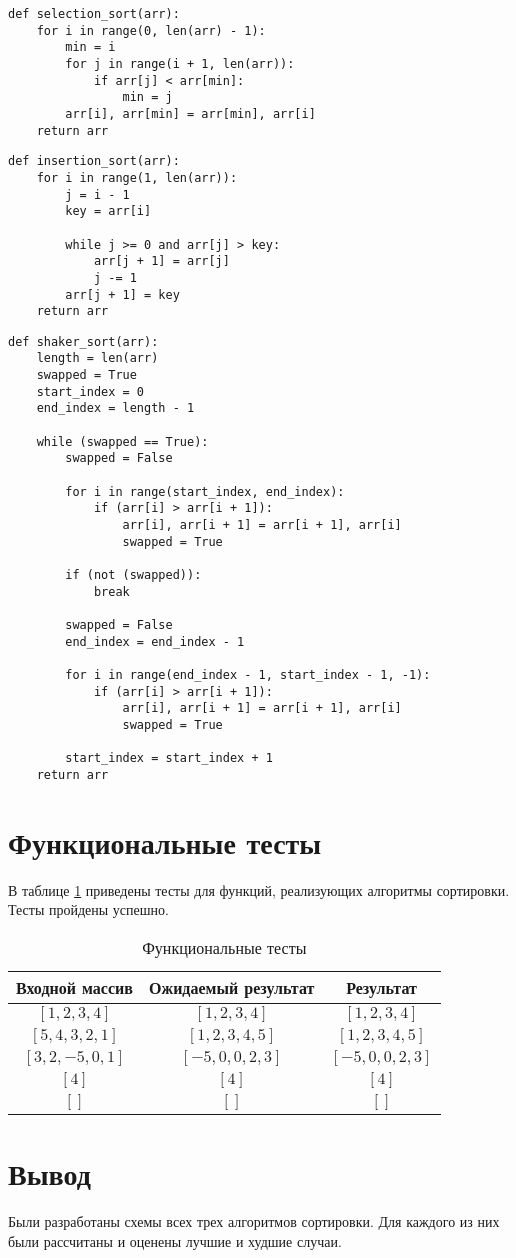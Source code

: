 \begin{lstlisting}[label=lst:vyb_sort,caption=Алгоритм сортировки выбором]
def selection_sort(arr):
	for i in range(0, len(arr) - 1):
		min = i
		for j in range(i + 1, len(arr)):
			if arr[j] < arr[min]:
				min = j
		arr[i], arr[min] = arr[min], arr[i]
	return arr
\end{lstlisting}

\begin{lstlisting}[label=lst:vst_sort,caption= Алгоритм сортировки вставками]
def insertion_sort(arr):
	for i in range(1, len(arr)):
		j = i - 1
		key = arr[i]
		
		while j >= 0 and arr[j] > key:
			arr[j + 1] = arr[j]
			j -= 1
		arr[j + 1] = key
	return arr	
\end{lstlisting}

\begin{lstlisting}[label=lst:sheyker_sort,caption=Алгоритм сортировки перемешиванием (или сортировка шейкер)]
def shaker_sort(arr):
	length = len(arr)
	swapped = True
	start_index = 0
	end_index = length - 1
	
	while (swapped == True):
		swapped = False
		
		for i in range(start_index, end_index):
			if (arr[i] > arr[i + 1]):
				arr[i], arr[i + 1] = arr[i + 1], arr[i]
				swapped = True
		
		if (not (swapped)):
			break
		
		swapped = False
		end_index = end_index - 1
		
		for i in range(end_index - 1, start_index - 1, -1):
			if (arr[i] > arr[i + 1]):
				arr[i], arr[i + 1] = arr[i + 1], arr[i]
				swapped = True
			
		start_index = start_index + 1
	return arr
\end{lstlisting}

\section{Функциональные тесты}

В таблице \ref{tbl:functional_test} приведены тесты для функций, реализующих алгоритмы сортировки. Тесты пройдены успешно.


\begin{table}[h]
	\begin{center}
		\caption{\label{tbl:functional_test} Функциональные тесты}
		\begin{tabular}{|c|c|c|}
			\hline
			Входной массив & Ожидаемый результат & Результат \\ 
			\hline
			$[1,2,3,4]$ & $[1,2,3,4]$  & $[1,2,3,4]$\\
			$[5,4,3,2,1]$  & $[1,2,3,4,5]$ & $[1,2,3,4,5]$\\
			$[3,2,-5,0,1]$  & $[-5,0,0,2,3]$  & $[-5,0,0,2,3]$\\
			$[4]$  & $[4]$  & $[4]$\\
			$[]$  & $[]$  & $[]$\\
			\hline
		\end{tabular}
	\end{center}
\end{table}


\section*{Вывод}

Были разработаны схемы всех трех алгоритмов сортировки. Для каждого из них были рассчитаны и оценены лучшие и худшие случаи.

